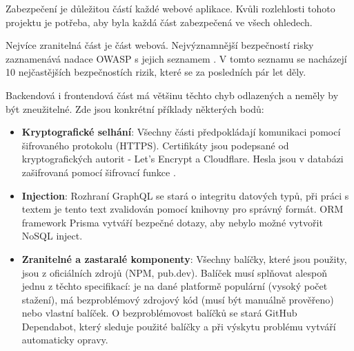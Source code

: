 Zabezpečení je důležitou částí každé webové aplikace. Kvůli rozlehlosti tohoto projektu je potřeba, aby byla každá část zabezpečená ve všech ohledech.\par
Nejvíce zranitelná část je část webová. Nejvýznamnější bezpečností risky zaznamenává nadace OWASP\cite{OWASP} s jejich seznamem \cite{OWASP-top-ten}. V tomto seznamu se nacházejí 10 nejčastějších bezpečnostích rizik, které se za posledních pár let děly.\par
Backendová i frontendová část má většinu těchto chyb odlazených a neměly by být zneužitelné. Zde jsou konkrétní příklady některých bodů:
\begin{itemize}
	\item \textbf{Kryptografické selhání}\cite{CryptographicFailures}: Všechny části předpokládají komunikaci pomocí šifrovaného protokolu (HTTPS). Certifikáty jsou podepsané od kryptografických autorit - Let's Encrypt a Cloudflare. Hesla jsou v databázi zašifrovaná pomocí šifrovací funkce \cite{bcrypt}.
	\item \textbf{Injection}\cite{Injection}: Rozhraní GraphQL se stará o integritu datových typů, při práci s textem je tento text zvalidován pomocí knihovny \cite{Validator} pro správný formát. ORM framework Prisma vytváří bezpečné dotazy, aby nebylo možné vytvořit NoSQL inject.
	\item \textbf{Zranitelné a zastaralé komponenty}\cite{VulnerableAndOutdatedComponents}: Všechny balíčky, které jsou použity, jsou z oficiálních zdrojů (NPM, pub.dev). Balíček musí splňovat alespoň jednu z těchto specifikací: je na dané platformě populární (vysoký počet stažení), má bezproblémový zdrojový kód (musí být manuálně prověřeno) nebo vlastní balíček. O bezproblémovost balíčků se stará GitHub Dependabot, který sleduje použité balíčky a při výskytu problému vytváří automaticky opravy.
\end{itemize}
